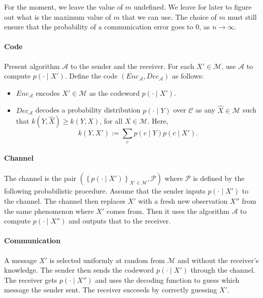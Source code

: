 For the moment, we leave the value of $m$ undefined. We leave for later to figure out what is the maximum value of $m$ that we can use. The choice of $m$ must still ensure that the probability of a communication error goes to 0, as $n \to \infty$.

\paragraph{Code} Present algorithm $\mathcal{A}$ to the sender and the receiver. For each $X' \in \mathcal{M}$, use $\mathcal{A}$ to compute $p(\cdot \mid X')$. Define the code $(\mathit{Enc}_{\mathcal{A}}, \mathit{Dec}_{\mathcal{A}})$ as follows:

\begin{itemize}
\item $\mathit{Enc}_{\mathcal{A}}$ encodes $X' \in \mathcal{M}$ as the codeword $p(\cdot \mid X')$.
\item $\mathit{Dec}_{\mathcal{A}}$ decodes a probability distribution $p(\cdot \mid Y)$ over $\mathcal{C}$ as any $\hat{X} \in \mathcal{M}$ such that $k\left(Y, \hat{X}\right) \geq k\left(Y, X\right)$, for all $X \in \mathcal{M}$. Here,
%
$$k\left(Y, X'\right) := \sum_c p(c \mid Y)p(c \mid X').$$
%
\end{itemize}

\paragraph{Channel} The channel is the pair $\left(\left\{p(\cdot \mid X')\right\}_{X' \in \mathcal{M}}, \mathcal{P}\right)$ where $\mathcal{P}$ is defined by the following probabilistic procedure. Assume that the sender inputs $p(\cdot \mid X')$ to the channel. The channel then replaces $X'$ with a fresh new observation $X''$ from the same phenomenon where $X'$ comes from. Then it uses the algorithm $\mathcal{A}$ to compute $p(\cdot \mid X'')$ and outputs that to the receiver.

\paragraph{Communication} A message $X'$ is selected uniformly at random from $\mathcal{M}$ and without the receiver's knowledge. The sender then sends the codeword $p(\cdot \mid X')$ through the channel. The receiver gets $p(\cdot \mid X'')$ and uses the decoding function to guess which message the sender sent. The receiver succeeds by correctly guessing $X'$.

